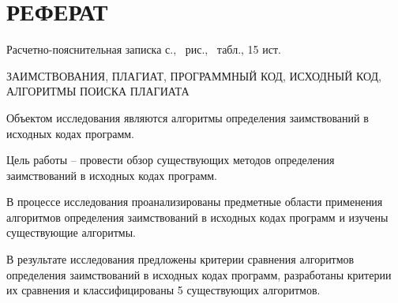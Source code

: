 \section*{РЕФЕРАТ}

Расчетно-пояснительная записка \pageref{LastPage} с., \totalfigures\ рис., \totaltables\ табл., 15 ист.

ЗАИМСТВОВАНИЯ, ПЛАГИАТ, ПРОГРАММНЫЙ КОД, ИСХОДНЫЙ КОД, АЛГОРИТМЫ ПОИСКА ПЛАГИАТА


Объектом исследования являются алгоритмы определения заимствований в исходных кодах программ. 

Цель работы -- провести обзор существующих методов определения заимствований в исходных кодах программ.

В процессе исследования проанализированы предметные области применения алгоритмов определения заимствований в исходных кодах программ и изучены существующие алгоритмы.

В результате исследования предложены критерии сравнения алгоритмов определения заимствований в исходных кодах программ, разработаны критерии их сравнения и классифицированы 5 существующих алгоритмов.

\pagebreak